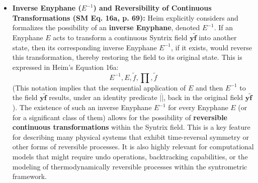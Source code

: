 \documentclass[12pt]{article}
\newcommand{\enyphane}{E}
\begin{document}
\begin{itemize}
    \item \textbf{Inverse Enyphane (\(\enyphane^{-1}\)) and Reversibility of Continuous Transformations (SM Eq. 16a, p. 69):}
    Heim explicitly considers and formalizes the possibility of an \textbf{inverse Enyphane}, denoted \( \enyphane^{-1} \). If an Enyphane \( \enyphane \) acts to transform a continuous Syntrix field \( \mathbf{y\widetilde{f}} \) into another state, then its corresponding inverse Enyphane \( \enyphane^{-1} \), if it exists, would reverse this transformation, thereby restoring the field to its original state. This is expressed in Heim's Equation 16a:
    \begin{equation}
    E^{-1}, E, \widetilde{f}, \prod, \widetilde{f}
    \label{eq:original_inverse_enyphane}
    \end{equation}
    (This notation implies that the sequential application of \( \enyphane \) and then \( \enyphane^{-1} \) to the field \( \mathbf{y\widetilde{f}} \) results, under an identity predicate \( \overline{||} \), back in the original field \( \mathbf{y\widetilde{f}} \)). The existence of such an inverse Enyphane \( \enyphane^{-1} \) for every Enyphane \( \enyphane \) (or for a significant class of them) allows for the possibility of \textbf{reversible continuous transformations} within the Syntrix field. This is a key feature for describing many physical systems that exhibit time-reversal symmetry or other forms of reversible processes. It is also highly relevant for computational models that might require undo operations, backtracking capabilities, or the modeling of thermodynamically reversible processes within the syntrometric framework.


\end{itemize}
\end{document}
